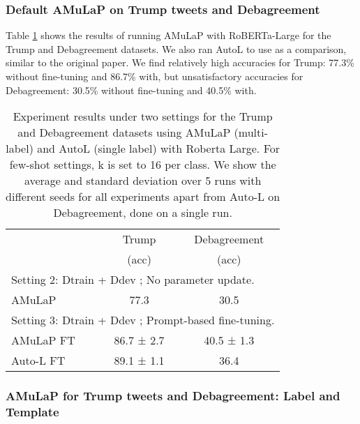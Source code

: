  
\subsubsection{Default AMuLaP on Trump tweets and Debagreement}

Table \ref{table:TrumpDebResults} shows the results of running AMuLaP with RoBERTa-Large for the Trump and Debagreement datasets. We also ran AutoL to use as a comparison, similar to the original paper. We find relatively high accuracies for Trump: 77.3\% without fine-tuning and 86.7\% with, but unsatisfactory accuracies for Debagreement: 30.5\% without fine-tuning and 40.5\% with. 


\begin{table}[h!]
\centering
{%
\begin{tabular}{|l| c c|}

 \hline
  & Trump & Debagreement\\ 
  & (acc) & (acc)\\[0.5ex] 
 \hline
 \multicolumn{3}{|l|}{Setting 2: Dtrain + Ddev ; No parameter update.} \\
 \hline
 AMuLaP & 77.3 & 30.5 \\
 \hline
 \multicolumn{3}{|l|}{Setting 3: Dtrain + Ddev ; Prompt-based fine-tuning.} \\
 \hline
 AMuLaP FT & 86.7 ± 2.7 & 40.5 ± 1.3 \\
 Auto-L FT & 89.1 ± 1.1 & 36.4 \\ 
 [0.1ex] 
 \hline
\end{tabular}}
\caption{Experiment results under two settings for the Trump and Debagreement datasets using AMuLaP (multi-label) and AutoL (single label) with Roberta Large. For few-shot settings, k is set to 16 per class. We show the average and standard deviation over 5 runs with different seeds for all experiments apart from Auto-L on Debagreement, done on a single run.}
\label{table:TrumpDebResults}
\end{table}

\subsubsection{AMuLaP for Trump tweets and Debagreement: Label and Template}

